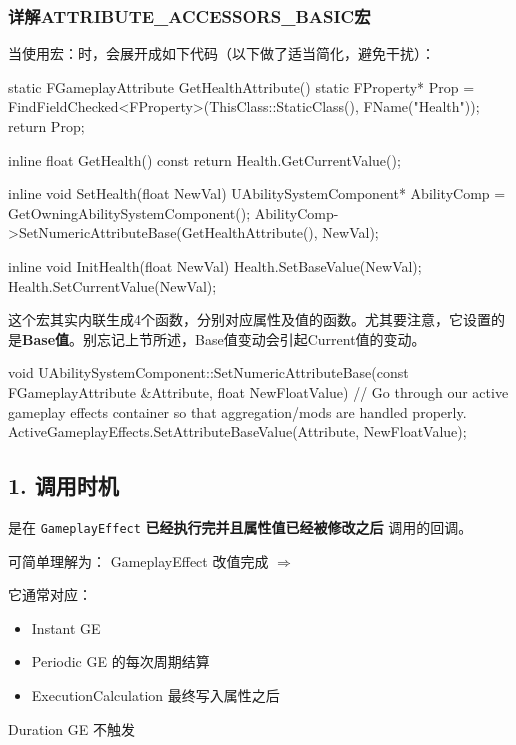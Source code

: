 \documentclass[10pt,CJKmath]{ctexart}
\begin{document}
\subsubsection{详解ATTRIBUTE\_ACCESSORS\_BASIC宏}
当使用宏：时，会展开成如下代码（以下做了适当简化，避免干扰）：
\begin{code}[caption={简化的宏展开}]

static FGameplayAttribute GetHealthAttribute()
{
	static FProperty* Prop = FindFieldChecked<FProperty>(ThisClass::StaticClass(),
	FName("Health"));
	return Prop;
}

inline float GetHealth() const { return Health.GetCurrentValue(); }

inline void SetHealth(float NewVal)
{
	UAbilitySystemComponent* AbilityComp = GetOwningAbilitySystemComponent();
	AbilityComp->SetNumericAttributeBase(GetHealthAttribute(), NewVal);
}

inline void InitHealth(float NewVal)
{
	Health.SetBaseValue(NewVal);
	Health.SetCurrentValue(NewVal);
}
\end{code}
这个宏其实内联生成4个函数，分别对应属性及值的函数。尤其要注意，它设置的是\textbf{Base值}。别忘记上节所述，Base值变动会引起Current值的变动。
\begin{code}[caption={Base值变动，触发所有当前激活的GE重新设置Base值}]
void UAbilitySystemComponent::SetNumericAttributeBase(const FGameplayAttribute &Attribute, float NewFloatValue)
{
	// Go through our active gameplay effects container so that aggregation/mods are handled properly.
	ActiveGameplayEffects.SetAttributeBaseValue(Attribute, NewFloatValue);
}	
\end{code}



\subsection{1. 调用时机}

是在 \texttt{GameplayEffect} \textbf{已经执行完并且属性值已经被修改之后} 调用的回调。

可简单理解为：
	GameplayEffect 改值完成 $\Rightarrow$ 

它通常对应：
\begin{itemize}
	\item Instant GE
	\item Periodic GE 的每次周期结算
	\item ExecutionCalculation 最终写入属性之后
\end{itemize}
\begin{marker}
	 Duration GE 不触发 
\end{marker}
\end{document}
